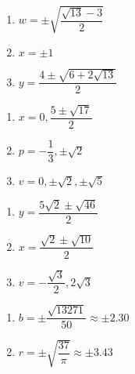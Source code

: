 \documentclass[11pt]{article}
\theoremstyle{definition}  %
\newcounter{HW}
\begin{document}
\begin{multicols}{3}
\begin{enumerate}
\setcounter{enumi}{\value{HW}}

\item $w = \pm \sqrt{\dfrac{\sqrt{13} - 3}{2}}$
\item $x = \pm 1$
\item $y = \dfrac{4 \pm \sqrt{6 + 2 \sqrt{13}}}{2}$

\setcounter{HW}{\value{enumi}}
\end{enumerate}
\end{multicols}

\begin{multicols}{3}
\begin{enumerate}
\setcounter{enumi}{\value{HW}}

\item $x = 0, \dfrac{5 \pm \sqrt{17}}{2}$
\item $p = -\dfrac{1}{3}, \pm \sqrt{2}$ 
\item $v = 0, \pm \sqrt{2}, \pm \sqrt{5}$

\setcounter{HW}{\value{enumi}}
\end{enumerate}
\end{multicols}



\begin{multicols}{3}
\begin{enumerate}
\setcounter{enumi}{\value{HW}}

\item $y = \dfrac{5\sqrt{2} \pm \sqrt{46}}{2}$
\item $x = \dfrac{\sqrt{2} \pm \sqrt{10}}{2}$
\item $v = -\dfrac{\sqrt{3}}{2}, 2\sqrt{3}$

\setcounter{HW}{\value{enumi}}
\end{enumerate}
\end{multicols}


\begin{multicols}{2}
\begin{enumerate}
\setcounter{enumi}{\value{HW}}

\item $b = \pm \dfrac{\sqrt{13271}}{50} \approx \pm 2.30$
\item $r = \pm \sqrt{\dfrac{37}{\pi}} \approx \pm 3.43$ 



\setcounter{HW}{\value{enumi}}
\end{enumerate}
\end{multicols}
\end{document}
